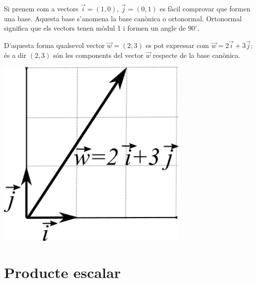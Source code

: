 \begin{theorybox}
	\begin{minipage}{0.7\textwidth}
	Si prenem com a vectors $\vec i = (1, 0)$, $\vec j = (0,1)$ es fàcil comprovar que formen una base. Aquesta base s'anomena la base canònica o ortonormal. Ortonormal significa que els vectors tenen mòdul 1 i formen un angle de $90^\circ$.
	
	D'aquesta forma qualsevol vector $\vec w = (2, 3)$ es pot expressar com $\vec w = 2 \vec i +  3\vec j$; és a dir $(2, 3)$ són les components del vector $\vec w$ respecte de la base canònica.
	\end{minipage}
	\begin{minipage}{0.3\textwidth}
		\centering
		\includegraphics[width=0.7\textwidth]{img-08/canonica.png}
	\end{minipage}
\end{theorybox}

 
\section{Producte escalar}

